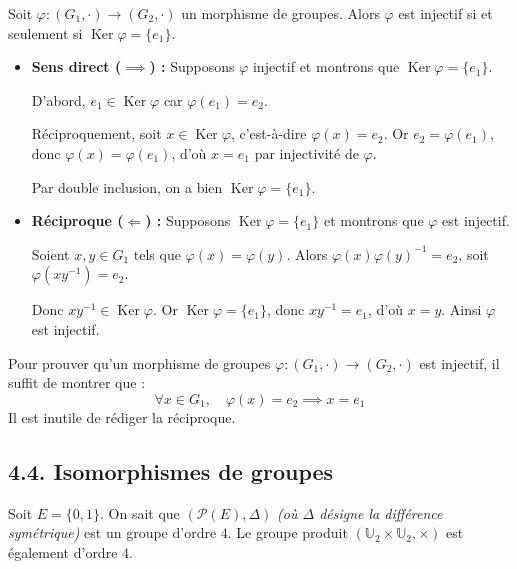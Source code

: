 \documentclass[a4paper,11pt]{article}
\newcommand{\U}{\mathbb{U}}
\DeclareMathOperator{\Ker}{Ker}
\begin{document}
\begin{proposition}
Soit $\varphi : (G_1, \cdot) \to (G_2, \cdot)$ un morphisme de groupes.
Alors $\varphi$ est injectif si et seulement si $\Ker \varphi = \{e_1\}$.
\end{proposition}

\begin{demonstration}
\begin{itemize}
  \item \textbf{Sens direct ($\implies$) :} Supposons $\varphi$ injectif et montrons que $\Ker \varphi = \{e_1\}$.
  
  D'abord, $e_1 \in \Ker \varphi$ car $\varphi(e_1) = e_2$.
  
  Réciproquement, soit $x \in \Ker \varphi$, c'est-à-dire $\varphi(x) = e_2$. Or $e_2 = \varphi(e_1)$, donc $\varphi(x) = \varphi(e_1)$, d'où $x = e_1$ par injectivité de $\varphi$.
  
  Par double inclusion, on a bien $\Ker \varphi = \{e_1\}$.

  \item \textbf{Réciproque ($\Longleftarrow$) :} Supposons $\Ker \varphi = \{e_1\}$ et montrons que $\varphi$ est injectif.
  
  Soient $x, y \in G_1$ tels que $\varphi(x) = \varphi(y)$. Alors $\varphi(x)\varphi(y)^{-1} = e_2$, soit $\varphi(x y^{-1}) = e_2$.
  
  Donc $x y^{-1} \in \Ker \varphi$. Or $\Ker \varphi = \{e_1\}$, donc $x y^{-1} = e_1$, d'où $x = y$. Ainsi $\varphi$ est injectif.
\end{itemize}
\end{demonstration}

\begin{methode}
Pour prouver qu'un morphisme de groupes $\varphi : (G_1, \cdot) \to (G_2, \cdot)$ est injectif, il suffit de montrer que :
\[
\forall x \in G_1, \quad \varphi(x) = e_2 \implies x = e_1
\]
Il est inutile de rédiger la réciproque.
\end{methode}

\newpage
\subsection{4.4. Isomorphismes de groupes}

Soit $E = \{0, 1\}$. On sait que $(\mathcal{P}(E), \Delta)$ \textit{(où $\Delta$ désigne la différence symétrique)} est un groupe d'ordre $4$. Le groupe produit $(\U_2 \times \U_2, \times)$ est également d'ordre $4$.
\end{document}
